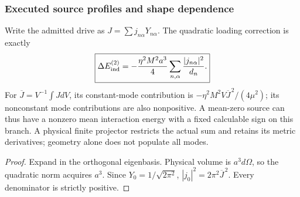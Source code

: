 \documentclass[12pt,a4paper]{article}
\begin{document}
\subsubsection{Executed source profiles and shape dependence}
\begin{proposition}
\label{p8:prop:v2206-compact-profile-energy}
Write the admitted drive as $J=\sum j_{n\alpha}Y_{n\alpha}$. The
quadratic loading correction is exactly
\begin{equation}
\label{p8:eq:v2206-compact-profile-energy}
 \boxed{\Delta E_{\rm ind}^{(2)}
 =-\frac{\eta^2M^2a^3}{4}
       \sum_{n,\alpha}\frac{|j_{n\alpha}|^2}{d_n}.}
\end{equation}
For $\overline J=V^{-1}\int JdV$, its constant-mode contribution is
$-\eta^2M^2V\overline J^{\,2}/(4\mu^2)$; its nonconstant mode
contributions are also nonpositive. A mean-zero source can thus have a
nonzero mean interaction energy with a fixed calculable sign on this
branch. A physical finite projector restricts the actual sum and retains
its metric derivatives; geometry alone does not populate all modes.
\end{proposition}
\begin{proof}
Expand in the orthogonal eigenbasis. Physical volume is $a^3d\Omega$,
so the quadratic norm acquires $a^3$. Since
$Y_0=1/\sqrt{2\pi^2}$, $|j_0|^2=2\pi^2\overline J^{\,2}$.
Every denominator is strictly positive.
\end{proof}
\end{document}
